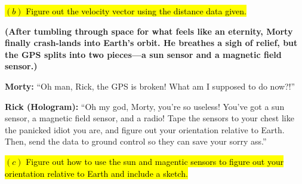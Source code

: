 \documentclass[a4paper, 12pt]{exam}
\begin{document}
\hl{$(b)$ Figure out the velocity vector using the distance data given.} \bigskip

\noindent \textbf{(After tumbling through space for what feels like an eternity, Morty finally crash-lands into Earth’s orbit. He breathes a sigh of relief, but the GPS splits into two pieces—a sun sensor and a magnetic field sensor.)} \bigskip

\noindent \textbf{Morty:} “Oh man, Rick, the GPS is broken! What am I supposed to do now?!” \bigskip

\noindent \textbf{Rick (Hologram):} “Oh my god, Morty, you’re so useless! You’ve got a sun sensor, a magnetic field sensor, and a radio! Tape the sensors to your chest like the panicked idiot you are, and figure out your orientation relative to Earth. Then, send the data to ground control so they can save your sorry ass.”

\bigskip

\hl{$(c)$ Figure out how to use the sun and magentic sensors to figure out your orientation relative to Earth and include a sketch.} \bigskip
	
	
\pagebreak
\end{document}

